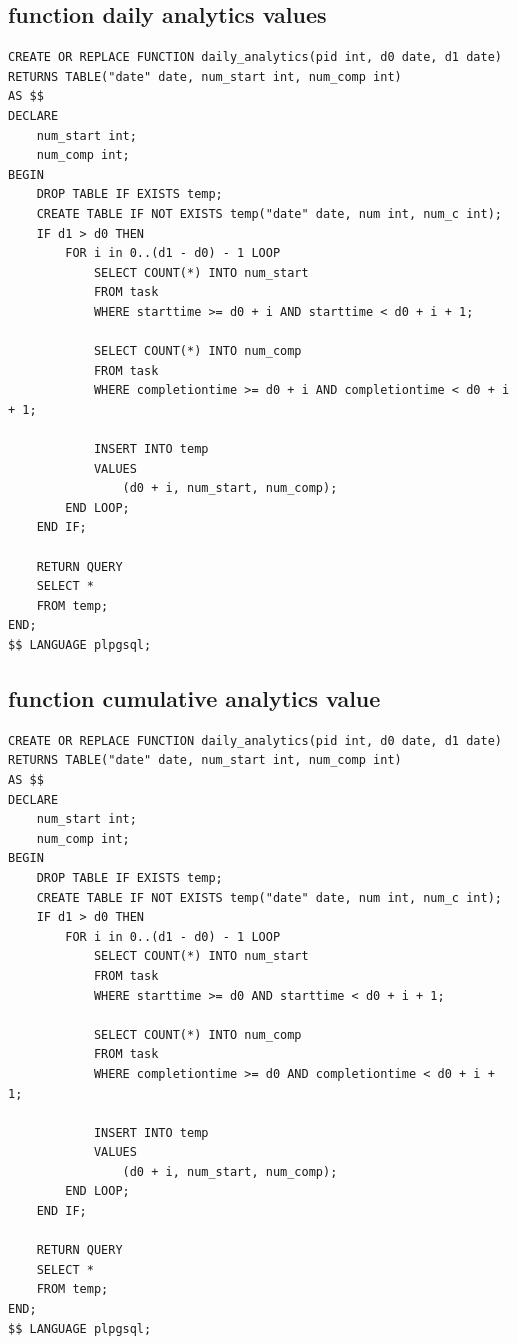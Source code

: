 \documentclass[conference,onecolumn]{IEEEtran}
\begin{document}
\subsection{function daily analytics values}
\begin{verbatim}
CREATE OR REPLACE FUNCTION daily_analytics(pid int, d0 date, d1 date)
RETURNS TABLE("date" date, num_start int, num_comp int)
AS $$
DECLARE
    num_start int;
    num_comp int;
BEGIN
    DROP TABLE IF EXISTS temp;
    CREATE TABLE IF NOT EXISTS temp("date" date, num int, num_c int);
    IF d1 > d0 THEN
        FOR i in 0..(d1 - d0) - 1 LOOP
            SELECT COUNT(*) INTO num_start
            FROM task
            WHERE starttime >= d0 + i AND starttime < d0 + i + 1;

            SELECT COUNT(*) INTO num_comp
            FROM task
            WHERE completiontime >= d0 + i AND completiontime < d0 + i + 1;

            INSERT INTO temp
            VALUES
                (d0 + i, num_start, num_comp);
        END LOOP;
    END IF;

    RETURN QUERY
    SELECT *
    FROM temp;
END;
$$ LANGUAGE plpgsql;
\end{verbatim}

\subsection{function cumulative analytics value}
\begin{verbatim}
CREATE OR REPLACE FUNCTION daily_analytics(pid int, d0 date, d1 date)
RETURNS TABLE("date" date, num_start int, num_comp int)
AS $$
DECLARE
    num_start int;
    num_comp int;
BEGIN
    DROP TABLE IF EXISTS temp;
    CREATE TABLE IF NOT EXISTS temp("date" date, num int, num_c int);
    IF d1 > d0 THEN
        FOR i in 0..(d1 - d0) - 1 LOOP
            SELECT COUNT(*) INTO num_start
            FROM task
            WHERE starttime >= d0 AND starttime < d0 + i + 1;

            SELECT COUNT(*) INTO num_comp
            FROM task
            WHERE completiontime >= d0 AND completiontime < d0 + i + 1;

            INSERT INTO temp
            VALUES
                (d0 + i, num_start, num_comp);
        END LOOP;
    END IF;

    RETURN QUERY
    SELECT *
    FROM temp;
END;
$$ LANGUAGE plpgsql;
\end{verbatim}
\end{document}
